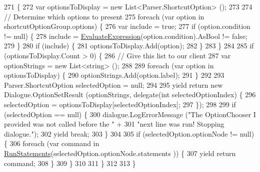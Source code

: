 \begin{DoxyCode}
271         \{
272             var optionsToDisplay = \textcolor{keyword}{new} List<Parser.ShortcutOption> ();
273 
274             \textcolor{comment}{// Determine which options to present}
275             \textcolor{keywordflow}{foreach} (var option \textcolor{keywordflow}{in} shortcutOptionGroup.options) \{
276                 var include = \textcolor{keyword}{true};
277                 \textcolor{keywordflow}{if} (option.condition != null) \{
278                     include = \hyperlink{a00097_ac57271c72da4ec456a32c94d951c8b65}{EvaluateExpression}(option.condition).AsBool != \textcolor{keyword}{false};
279                 \}
280                 \textcolor{keywordflow}{if} (include) \{
281                     optionsToDisplay.Add(option);
282                 \}
283             \}
284 
285             \textcolor{keywordflow}{if} (optionsToDisplay.Count > 0) \{
286                 \textcolor{comment}{// Give this list to our client}
287                 var optionStrings = \textcolor{keyword}{new} List<string> ();
288 
289                 \textcolor{keywordflow}{foreach} (var option \textcolor{keywordflow}{in} optionsToDisplay) \{
290                     optionStrings.Add(option.label);
291                 \}
292 
293                 Parser.ShortcutOption selectedOption = null;
294 
295                 yield \textcolor{keywordflow}{return} \textcolor{keyword}{new} Dialogue.OptionSetResult (optionStrings, delegate(\textcolor{keywordtype}{int} selectedOptionIndex)
       \{
296                     selectedOption = optionsToDisplay[selectedOptionIndex];
297                 \});
298 
299                 \textcolor{keywordflow}{if} (selectedOption == null) \{
300                     dialogue.LogErrorMessage (\textcolor{stringliteral}{"The OptionChooser I provided was not called before the "} +
301                         \textcolor{stringliteral}{"next line was run! Stopping dialogue."});
302                     yield \textcolor{keywordflow}{break};
303                 \}
304 
305                 \textcolor{keywordflow}{if} (selectedOption.optionNode != null) \{
306                     \textcolor{keywordflow}{foreach} (var command \textcolor{keywordflow}{in} \hyperlink{a00097_aa436557ec45c8e98d194d9af139d9170}{RunStatements}(selectedOption.optionNode.statements
      )) \{
307                         yield \textcolor{keywordflow}{return} command;
308                     \}
309                 \}
310                     
311             \}
312 
313         \}
\end{DoxyCode}
